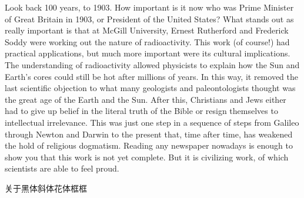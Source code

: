 Look back 100 years, to 1903. How important is it now who was Prime Minister of Great Britain in 1903, or President of the United States? What stands out as really important is that at McGill University, Ernest Rutherford and Frederick Soddy were working out the nature of radioactivity. This work (of course!) had practical applications, but much more important were its cultural implications. The understanding of radioactivity allowed physicists to explain how the Sun and Earth's cores could still be hot after millions of years. In this way, it removed the last scientific objection to what many geologists and paleontologists thought was the great age of the Earth and the Sun. After this, Christians and Jews either had to give up belief in the literal truth of the Bible or resign themselves to intellectual irrelevance. This was just one step in a sequence of steps from Galileo through Newton and Darwin to the present that, time after time, has weakened the hold of religious dogmatism. Reading any newspaper nowadays is enough to show you that this work is not yet complete. But it is civilizing work, of which scientists are able to feel proud.
\newpage
\begin{center}
    关于黑体斜体花体框框
\end{center}
